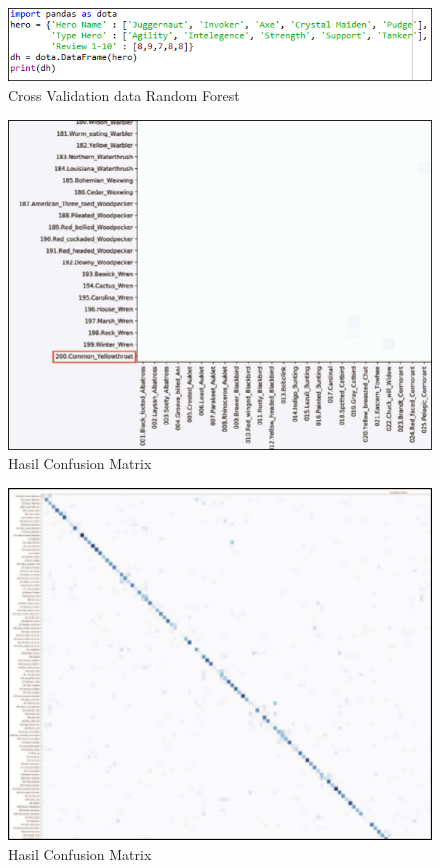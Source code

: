 \begin{figure}[ht]
	\centerline{\includegraphics[width=1\textwidth]{figures/fathi/chapter3/hari2/fix.png}}
	\caption{Cross Validation data Random Forest}
	\label{fix}
\end{figure}

\begin{figure}[ht]
	\centerline{\includegraphics[width=1\textwidth]{figures/fathi/chapter3/hari2/matrix.png}}
	\caption{Hasil Confusion Matrix}
	\label{matrix}
\end{figure}

\begin{figure}[ht]
	\centerline{\includegraphics[width=1\textwidth]{figures/fathi/chapter3/hari2/matrix2.png}}
	\caption{Hasil Confusion Matrix}
	\label{matrix2}
\end{figure}

